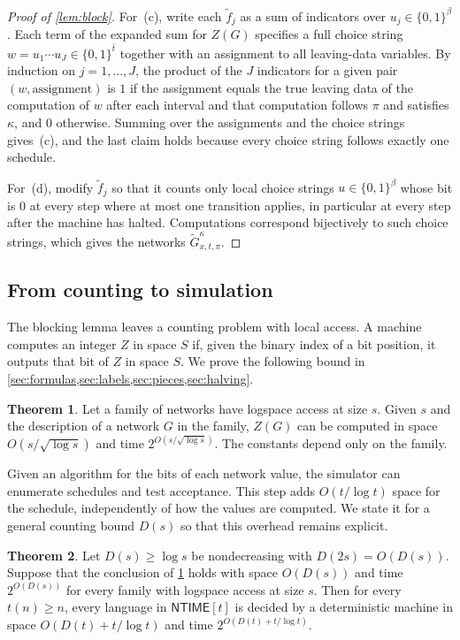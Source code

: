 \documentclass[11pt]{article}
\theoremstyle{definition}
\newtheorem{theorem}{Theorem}[section]
\theoremstyle{definition}
\theoremstyle{remark}
\newcommand{\NTIME}{\mathsf{NTIME}}
\begin{document}
\begin{proof}[Proof of \cref{lem:block}]
For~(c), write each $\tilde f_j$ as a sum of indicators over $u_j\in\{0,1\}^\beta$. Each term of the expanded sum for $Z(G)$ specifies a full choice string $w=u_1\cdots u_J\in\{0,1\}^{\bar t}$ together with an assignment to all leaving-data variables. By induction on $j=1,\dots,J$, the product of the $J$ indicators for a given pair $(w,\text{assignment})$ is $1$ if the assignment equals the true leaving data of the computation of $w$ after each interval and that computation follows $\pi$ and satisfies $\kappa$, and $0$ otherwise. Summing over the assignments and the choice strings gives~(c), and the last claim holds because every choice string follows exactly one schedule.

For~(d), modify $\tilde f_j$ so that it counts only local choice strings $u\in\{0,1\}^\beta$ whose bit is $0$ at every step where at most one transition applies, in particular at every step after the machine has halted. Computations correspond bijectively to such choice strings, which gives the networks $\tilde G^\kappa_{x,t,\pi}$.
\end{proof}

\subsection{From counting to simulation}

The blocking lemma leaves a counting problem with local access. A machine computes an integer $Z$ in space $S$ if, given the binary index of a bit position, it outputs that bit of $Z$ in space $S$. We prove the following bound in \cref{sec:formulas,sec:labels,sec:pieces,sec:halving}.

\begin{theorem}\label{thm:counting}
Let a family of networks have logspace access at size $s$. Given $s$ and the description of a network $G$ in the family, $Z(G)$ can be computed in space $O(s/\sqrt{\log s})$ and time $2^{O(s/\sqrt{\log s})}$. The constants depend only on the family.
\end{theorem}

Given an algorithm for the bits of each network value, the simulator can enumerate schedules and test acceptance. This step adds $O(t/\log t)$ space for the schedule, independently of how the values are computed. We state it for a general counting bound $D(s)$ so that this overhead remains explicit.

\begin{theorem}\label{thm:transfer}
Let $D(s)\ge\log s$ be nondecreasing with $D(2s)=O(D(s))$. Suppose that the conclusion of \cref{thm:counting} holds with space $O(D(s))$ and time $2^{O(D(s))}$ for every family with logspace access at size $s$. Then for every $t(n)\ge n$, every language in $\NTIME[t]$ is decided by a deterministic machine in space $O(D(t)+t/\log t)$ and time $2^{O(D(t)+t/\log t)}$.
\end{theorem}
\end{document}
